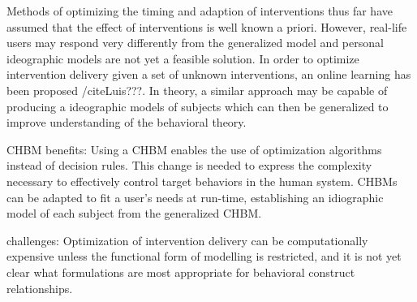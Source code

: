 \documentclass[runningheads,a4paper]{llncs}
\begin{document}
Methods of optimizing the timing and adaption of interventions thus far have assumed that the effect of interventions is well known a priori.
However, real-life users may respond very differently from the generalized model and personal ideographic models are not yet a feasible solution.
In order to optimize intervention delivery given a set of unknown interventions, an online learning has been proposed /cite{Luis???}.
In theory, a similar approach may be capable of producing a ideographic models of subjects which can then be generalized to improve understanding of the behavioral theory.

CHBM benefits:
Using a CHBM enables the use of optimization algorithms instead of decision rules. This change is needed to express the complexity necessary to effectively control target behaviors in the human system.
CHBMs can be adapted to fit a user's needs at run-time, establishing an idiographic model of each subject from the generalized CHBM.

challenges:
Optimization of intervention delivery can be computationally expensive unless the functional form of modelling is restricted, and it is not yet clear what formulations are most appropriate for behavioral construct relationships.
\end{document}
